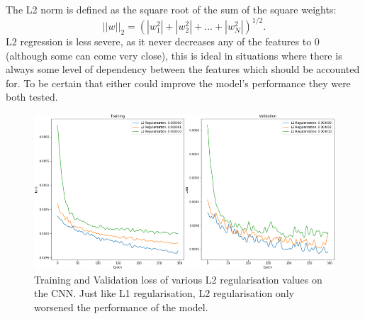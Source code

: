 \documentclass{l4proj}
\begin{document}
The L2 norm is defined as the square root of the sum of the square weights:
\begin{equation}
    ||w||_{2} = (|w^2_{1}| + |w^2_{2}| + ... + |w^2_{N}|)^{1/2}.
\end{equation}
L2 regression is less severe, as it never decreases any of the features to 0 (although some can come very close), this is ideal in situations where there is always some level of dependency between the features which should be accounted for. To be certain that either could improve the model's performance they were both tested. 
\begin{figure}[H]
    \centering
    \includegraphics[width=0.9\linewidth]{images/L2Regularisation.PNG}    

    \caption{Training and Validation loss of various L2 regularisation values on the CNN. Just like L1 regularisation, L2 regularisation only worsened the performance of the model.}

    \label{fig:l2regularisation} 
\end{figure}
\end{document}
